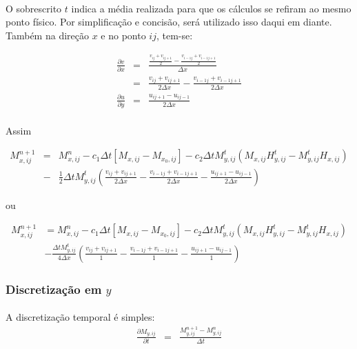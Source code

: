 \documentclass[eletromagnetismo.tex]{subfiles}
\begin{document}
\paragraph{} O sobrescrito $t$ indica a média realizada para que os cálculos se refiram ao mesmo ponto físico. Por simplificação e concisão, será utilizado isso daqui em diante. Também na direção $x$ e no ponto $ij$, tem-se:

\begin{eqnarray}
	\frac{\partial v}{\partial x} & = & \frac{\frac{v_{ij} + v_{ij+1}}{2} - \frac{v_{i-1j} + v_{i-1j+1}}{2}}{\Delta x}\\
	&=& \frac{v_{ij} + v_{ij+1}}{2\Delta x} - \frac{v_{i-1j} + v_{i-1j+1}}{2\Delta x}\\
	\frac{\partial u}{\partial y} & = & \frac{u_{ij+1} - u_{ij-1}}{2\Delta x}
\end{eqnarray}

\paragraph{} Assim

\begin{eqnarray}
M_{x,ij}^{n+1} & = & M_{x,ij}^n -c_1\Delta t[M_{x,ij} - M_{x_0,ij}]-c_2 \Delta t M_{y,ij}^t(M_{x,ij} H_{y,ij}^t - M_{y,ij}^t H_{x,ij})\nonumber \\
&-&\frac{1}{2}\Delta t M_{y,ij}^t\left(\frac{v_{ij} + v_{ij+1}}{2\Delta x} - \frac{v_{i-1j} + v_{i-1j+1}}{2\Delta x} - \frac{u_{ij+1} - u_{ij-1}}{2\Delta x}\right)
\end{eqnarray}

ou

\begin{align}
M_{x,ij}^{n+1} & = M_{x,ij}^n -c_1\Delta t[M_{x,ij} - M_{x_0,ij}]-c_2 \Delta t M_{y,ij}^t(M_{x,ij} H_{y,ij}^t - M_{y,ij}^t H_{x,ij})\nonumber \\
&- \frac{\Delta t M_{y,ij}^t}{4\Delta x}\left(\frac{v_{ij} + v_{ij+1}}{1} - \frac{v_{i-1j} + v_{i-1j+1}}{1} - \frac{u_{ij+1} - u_{ij-1}}{1}\right) \label{Mxnext}
\end{align}

\subsubsection{Discretização em $y$}

\paragraph{} A discretização temporal é simples:
\begin{eqnarray}
	\frac{\partial M_{y,ij}}{\partial t} & = & \frac{M_{y,ij}^{n+1} - M_{y,ij}^n}{\Delta t}
\end{eqnarray}
\end{document}
